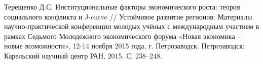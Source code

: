 \documentclass[10pt]{article}
\newcommand{\years}[1]{\marginnote{\scriptsize #1}}
\begin{document}
\years{2015}Терещенко Д.С. Институциональные факторы экономического роста: теория социального конфликта и J-curve // Устойчивое развитие регионов: Материалы научно-практической конференции молодых учёных с международным участием в рамках Седьмого Молодежного экономического форума «Новая экономика – новые возможности», 12-14 ноября 2015 года, г. Петрозаводск. Петрозаводск: Карельский научный центр РАН, 2015. С. 238–248.\\
\end{document}
